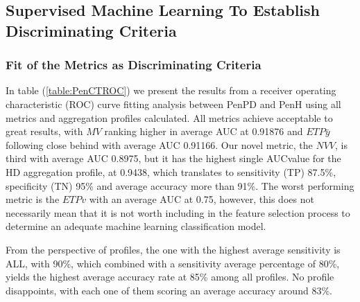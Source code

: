 


\subsection{Supervised Machine Learning To Establish Discriminating Criteria}
\label{subsec:PenCTML}

\subsubsection{Fit of the Metrics as Discriminating Criteria}
\label{subsubsec:PenCTMetricsFit}
In table (\ref{table:PenCTROC}) we present the results from a receiver operating characteristic (\gls{ROC}) curve fitting analysis between \gls{PenPD} and \gls{PenH} using all metrics and aggregation profiles calculated. All metrics achieve acceptable to great results, with $MV$ ranking higher in average \gls{AUC} at 0.91876 and $ETP\bar{y}$ following close behind with average \gls{AUC} 0.91166. Our novel metric, the $NVV$, is third with average \gls{AUC} 0.8975, but it has the highest single \gls{AUC}value for the HD aggregation profile, at 0.9438, which translates to sensitivity (\gls{TP}) 87.5\%, specificity (\gls{TN}) 95\% and average accuracy more than 91\%. The worst performing metric is the $ETPv$ with an average \gls{AUC} at 0.75, however, this does not necessarily mean that it is not worth including in the feature selection process to determine an adequate machine learning classification model. 

From the perspective of profiles, the one with the highest average sensitivity is ALL, with 90\%, which combined with a sensitivity average percentage of 80\%, yields the highest average accuracy rate at 85\% among all profiles. No profile disappoints, with each one of them scoring an average accuracy around 83\%.

